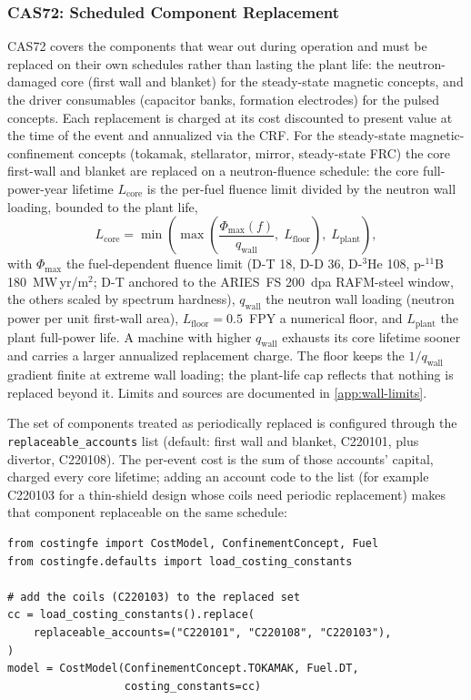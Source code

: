 \documentclass{article}
\begin{document}
\subsubsection{CAS72: Scheduled Component Replacement}
CAS72 covers the components that wear out during operation and must be
replaced on their own schedules rather than lasting the plant life: the
neutron-damaged core (first wall and blanket) for the steady-state
magnetic concepts, and the driver consumables (capacitor banks,
formation electrodes) for the pulsed concepts. Each replacement is
charged at its cost discounted to present value at the time of the event
and annualized via the CRF. For the steady-state
magnetic-confinement concepts (tokamak, stellarator, mirror,
steady-state FRC) the core first-wall and blanket are replaced on a
neutron-fluence schedule: the core full-power-year lifetime
$L_{\text{core}}$ is the per-fuel fluence limit divided by the neutron
wall loading, bounded to the plant life,
\begin{equation}
\label{eq:core-lifetime}
L_{\text{core}} = \min\!\left(
  \max\!\left(\frac{\Phi_{\max}(f)}{q_{\text{wall}}},\; L_{\text{floor}}\right),\;
  L_{\text{plant}}\right),
\end{equation}
with $\Phi_{\max}$ the fuel-dependent fluence limit (D-T 18, D-D 36,
D-${}^3$He 108, p-${}^{11}$B 180~MW\,yr/m$^2$; D-T anchored to the
ARIES~FS 200~dpa RAFM-steel window, the others scaled by spectrum
hardness), $q_{\text{wall}}$ the neutron wall loading (neutron power
per unit first-wall area), $L_{\text{floor}} = 0.5$~FPY a numerical
floor, and $L_{\text{plant}}$ the plant full-power life. A machine with
higher $q_{\text{wall}}$ exhausts its core lifetime sooner and carries a
larger annualized replacement charge. The floor keeps the
$1/q_{\text{wall}}$ gradient finite at extreme wall loading; the
plant-life cap reflects that nothing is replaced beyond it. Limits and
sources are documented in \cref{app:wall-limits}.

The set of components treated as periodically replaced is configured
through the \texttt{replaceable\_accounts} list (default: first wall and
blanket, C220101, plus divertor, C220108). The per-event cost is the sum
of those accounts' capital, charged every core lifetime; adding an
account code to the list (for example C220103 for a thin-shield design
whose coils need periodic replacement) makes that component replaceable
on the same schedule:

\begin{minipage}{\linewidth}
\begin{lstlisting}
from costingfe import CostModel, ConfinementConcept, Fuel
from costingfe.defaults import load_costing_constants

# add the coils (C220103) to the replaced set
cc = load_costing_constants().replace(
    replaceable_accounts=("C220101", "C220108", "C220103"),
)
model = CostModel(ConfinementConcept.TOKAMAK, Fuel.DT,
                  costing_constants=cc)
\end{lstlisting}
\end{minipage}
\end{document}

